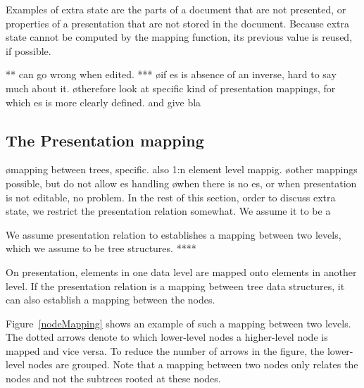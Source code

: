 Examples of extra state are the parts of a document that are not presented, or properties of a presentation that are not stored in the document. Because extra state cannot be computed by the mapping function, its previous value is reused, if possible. 

** can go wrong when edited. 
***
\bl
\o if es is absence of an inverse, hard to say much about it.
\o therefore look at specific kind of presentation mappings, for which es is more clearly defined. and give bla
\el





%																
\subsection{The Presentation mapping}\label{mappingsInLayer}


\bl
\o mapping between trees, specific. also 1:n element level mappig.
\o other mappings possible, but do not allow es handling
\o when there is no es, or when presentation is not editable, no problem.
\el
In the rest of this section, order to discuss extra state, we restrict the presentation relation somewhat. We assume it to be a

We assume presentation relation to establishes a mapping between two levels, which we assume to be tree structures. ****

On presentation, elements in one data level are mapped onto elements in another level. If the presentation relation is a mapping between tree data structures, it can also establish a mapping between the nodes. 

Figure~\ref{nodeMapping} shows an example of such a mapping between two levels. The dotted arrows denote to which lower-level nodes a higher-level node is mapped and vice versa. To reduce the number of arrows in the figure, the lower-level nodes are grouped. Note that a mapping between two nodes only relates the nodes and not the subtrees rooted at these nodes.

